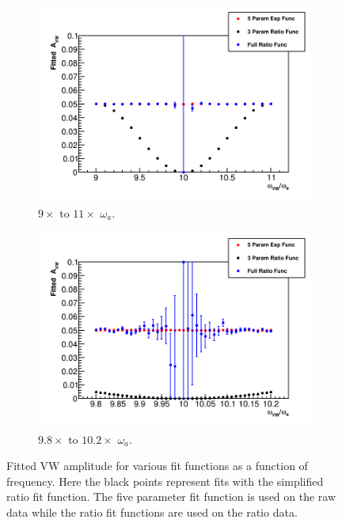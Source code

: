 \documentclass[12pt,letterpaper]{article}
\def\wa{$\omega_{a}$\xspace}
\begin{document}
\begin{figure}[]
\centering
    \begin{subfigure}[]{0.46\textwidth}
        \centering
        \includegraphics[width=\textwidth]{Fitted_Avw_Vs_Wvw-9x-10x}
        \caption{$9\times$ to $11\times$ \wa.}
    \end{subfigure}%
    \hspace{1cm}
    \begin{subfigure}[]{0.46\textwidth}
        \centering
        \includegraphics[width=\textwidth]{Fitted_Avw_Vs_Wvw-10x}
        \caption{$9.8\times$ to $10.2\times$ \wa.}
    \end{subfigure}
\caption[]{Fitted VW amplitude for various fit functions as a function of frequency. Here the black points represent fits with the simplified ratio fit function. The five parameter fit function is used on the raw data while the ratio fit functions are used on the ratio data.}
\label{fig:FittedAVW_myToyMC}
\end{figure}
\end{document}
